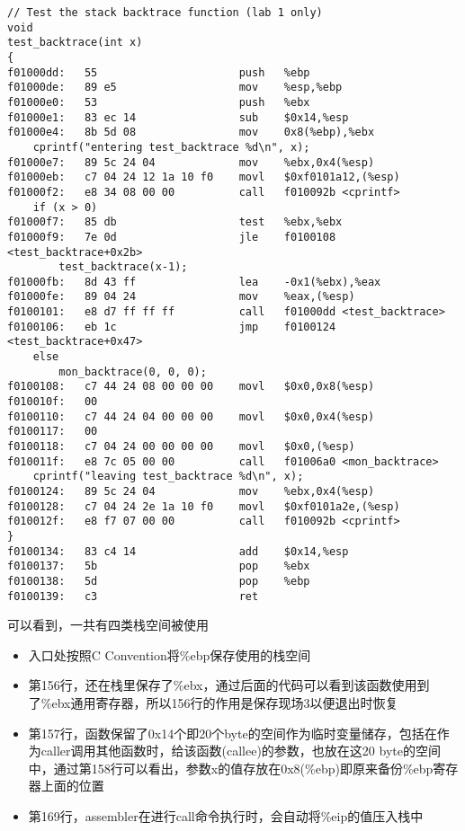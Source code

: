 \documentclass{article}
\begin{document}
\begin{CJK*}{UTF8}{gkai}
\begin{lstlisting}[style=acode, firstnumber=150, title={\scriptsize \ttfamily \bfseries obj/kern/kernel.asm}]
// Test the stack backtrace function (lab 1 only)
void
test_backtrace(int x)
{
f01000dd:	55                   	push   %ebp
f01000de:	89 e5                	mov    %esp,%ebp
f01000e0:	53                   	push   %ebx
f01000e1:	83 ec 14             	sub    $0x14,%esp
f01000e4:	8b 5d 08             	mov    0x8(%ebp),%ebx
	cprintf("entering test_backtrace %d\n", x);
f01000e7:	89 5c 24 04          	mov    %ebx,0x4(%esp)
f01000eb:	c7 04 24 12 1a 10 f0 	movl   $0xf0101a12,(%esp)
f01000f2:	e8 34 08 00 00       	call   f010092b <cprintf>
	if (x > 0)
f01000f7:	85 db                	test   %ebx,%ebx
f01000f9:	7e 0d                	jle    f0100108 <test_backtrace+0x2b>
		test_backtrace(x-1);
f01000fb:	8d 43 ff             	lea    -0x1(%ebx),%eax
f01000fe:	89 04 24             	mov    %eax,(%esp)
f0100101:	e8 d7 ff ff ff       	call   f01000dd <test_backtrace>
f0100106:	eb 1c                	jmp    f0100124 <test_backtrace+0x47>
	else
		mon_backtrace(0, 0, 0);
f0100108:	c7 44 24 08 00 00 00 	movl   $0x0,0x8(%esp)
f010010f:	00 
f0100110:	c7 44 24 04 00 00 00 	movl   $0x0,0x4(%esp)
f0100117:	00 
f0100118:	c7 04 24 00 00 00 00 	movl   $0x0,(%esp)
f010011f:	e8 7c 05 00 00       	call   f01006a0 <mon_backtrace>
	cprintf("leaving test_backtrace %d\n", x);
f0100124:	89 5c 24 04          	mov    %ebx,0x4(%esp)
f0100128:	c7 04 24 2e 1a 10 f0 	movl   $0xf0101a2e,(%esp)
f010012f:	e8 f7 07 00 00       	call   f010092b <cprintf>
}
f0100134:	83 c4 14             	add    $0x14,%esp
f0100137:	5b                   	pop    %ebx
f0100138:	5d                   	pop    %ebp
f0100139:	c3                   	ret    
\end{lstlisting}

可以看到，一共有四类栈空间被使用
\begin{itemize}
\item{入口处按照C \hspace{1ex}Convention将\%ebp保存使用的栈空间}
\item{第156行，还在栈里保存了\%ebx，通过后面的代码可以看到该函数使用到了\%ebx通用寄存器，所以156行的作用是保存现场3以便退出时恢复}
\item{第157行，函数保留了0x14个即20个byte的空间作为临时变量储存，包括在作为caller调用其他函数时，给该函数(callee)的参数，也放在这20 byte的空间中，通过第158行可以看出，参数x的值存放在0x8(\%ebp)即原来备份\%ebp寄存器上面的位置}
\item{第169行，assembler在进行call命令执行时，会自动将\%eip的值压入栈中}
\end{itemize}


\end{CJK*}
\end{document}
